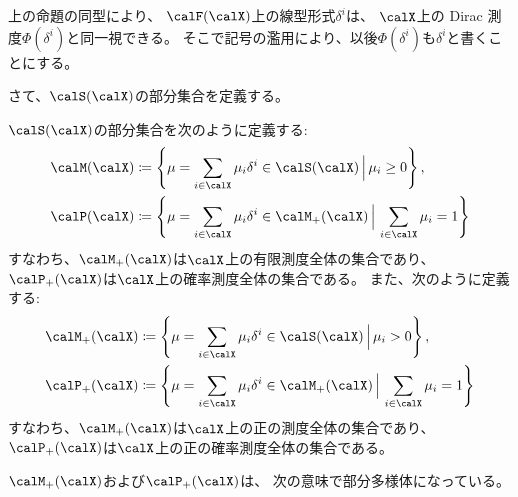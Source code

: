 \documentclass[report]{jlreq}
\begin{document}
上の命題の同型により、
$\calF(\calX)$上の線型形式$\delta^i$は、
$\calX$上の Dirac 測度$\Phi(\delta^i)$と同一視できる。
そこで記号の濫用により、以後$\Phi(\delta^i)$も$\delta^i$と書くことにする。

さて、$\calS(\calX)$の部分集合を定義する。

\begin{definition}
    $\calS(\calX)$の部分集合を次のように定義する:
    \begin{alignat}{1}
        \calM(\calX)
            &\coloneqq \mybrace{
                \mu = \sum_{i \in \calX} \mu_i \delta^i \in \calS(\calX)
                \,\Big|\,
                \mu_i \ge 0
            }, \\
        \calP(\calX)
            &\coloneqq \mybrace{
                \mu = \sum_{i \in \calX} \mu_i \delta^i \in \calM_+(\calX)
                \,\Big|\,
                \sum_{i \in \calX} \mu_i = 1
            }
    \end{alignat}
    すなわち、$\calM_+(\calX)$は$\calX$上の有限測度全体の集合であり、
    $\calP_+(\calX)$は$\calX$上の確率測度全体の集合である。
    また、次のように定義する:
    \begin{alignat}{1}
        \calM_+(\calX)
            &\coloneqq \mybrace{
                \mu = \sum_{i \in \calX} \mu_i \delta^i \in \calS(\calX)
                \,\Big|\,
                \mu_i > 0
            }, \\
        \calP_+(\calX)
            &\coloneqq \mybrace{
                \mu = \sum_{i \in \calX} \mu_i \delta^i \in \calM_+(\calX)
                \,\Big|\,
                \sum_{i \in \calX} \mu_i = 1
            }
    \end{alignat}
    すなわち、$\calM_+(\calX)$は$\calX$上の正の測度全体の集合であり、
    $\calP_+(\calX)$は$\calX$上の正の確率測度全体の集合である。
\end{definition}

$\calM_+(\calX)$および$\calP_+(\calX)$は、
次の意味で部分多様体になっている。

\end{document}
